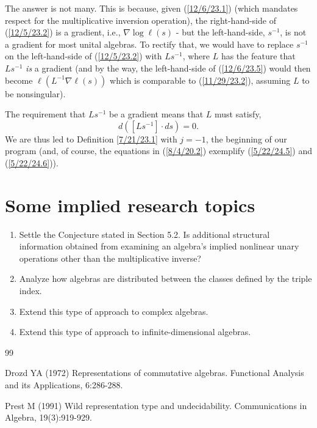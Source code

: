 \documentclass{amsart}
\numberwithin{equation}{section}
\theoremstyle{definition}
\numberwithin{theorem}{section}
\begin{document}
{The answer is not many.  This is because, given (\ref{12/6/23.1}) (which mandates respect for the multiplicative inversion operation), the right-hand-side of (\ref{12/5/23.2}) is a gradient, i.e., $\nabla\log \ell(s)$ - but the left-hand-side, $s^{-1}$,  is not a gradient for most unital algebras.  
To rectify that, we would have to replace $s^{-1}$ on the left-hand-side of (\ref{12/5/23.2}) with $Ls^{-1}$, where $L$ has the feature that $Ls^{-1}$ {\it is} a gradient (and by the way, the left-hand-side of (\ref{12/6/23.5}) would then become $\ell(L^{-1}\nabla\ell(s))$ which is comparable to  (\ref{11/29/23.2}), assuming $L$ to be nonsingular).   


The requirement that $Ls^{-1}$ be a gradient means that $L$ must satisfy, \[ d([Ls^{-1}]\cdot ds) = 0.\]  We are thus led to Definition \ref{7/21/23.1} with $j=-1$, the beginning of our program (and, of course, the equations in (\ref{8/4/20.2}) exemplify (\ref{5/22/24.5}) and (\ref{5/22/24.6})).

\vspace{1cm}

\section{Some implied research topics}
\begin{enumerate} \item Settle the Conjecture stated in Section 5.2. Is additional structural information obtained  from examining an algebra's implied nonlinear unary operations other than the multiplicative inverse?  \item Analyze how algebras are distributed between the classes defined by the triple index.  \item Extend this type of approach to complex algebras. \item Extend this type of approach to infinite-dimensional algebras. \end{enumerate}

\vspace{1cm}

  
   \begin{thebibliography}{99}
   

   
     Drozd YA (1972) Representations of commutative algebras. Functional Analysis and its Applications, 6:286-288.
   
        Prest M (1991) Wild representation type and undecidability.  Communications in Algebra, 19(3):919-929.
       

\end{thebibliography}}
\end{document}
